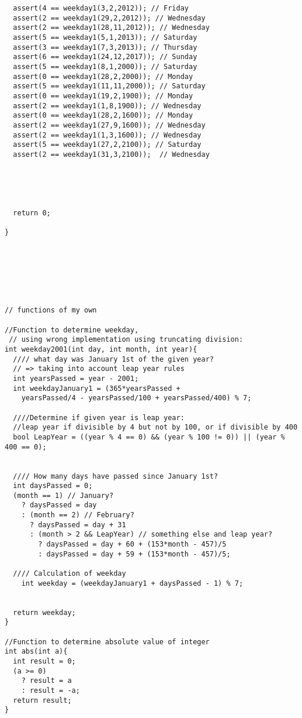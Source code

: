 \begin{lstlisting}
  assert(4 == weekday1(3,2,2012)); // Friday
  assert(2 == weekday1(29,2,2012)); // Wednesday
  assert(2 == weekday1(28,11,2012)); // Wednesday
  assert(5 == weekday1(5,1,2013)); // Saturday
  assert(3 == weekday1(7,3,2013)); // Thursday
  assert(6 == weekday1(24,12,2017)); // Sunday
  assert(5 == weekday1(8,1,2000)); // Saturday
  assert(0 == weekday1(28,2,2000)); // Monday  
  assert(5 == weekday1(11,11,2000)); // Saturday
  assert(0 == weekday1(19,2,1900)); // Monday
  assert(2 == weekday1(1,8,1900)); // Wednesday
  assert(0 == weekday1(28,2,1600)); // Monday
  assert(2 == weekday1(27,9,1600)); // Wednesday
  assert(2 == weekday1(1,3,1600)); // Wednesday
  assert(5 == weekday1(27,2,2100)); // Saturday
  assert(2 == weekday1(31,3,2100));  // Wednesday





  return 0;

}







// functions of my own

//Function to determine weekday,
 // using wrong implementation using truncating division:
int weekday2001(int day, int month, int year){
  //// what day was January 1st of the given year?
  // => taking into account leap year rules
  int yearsPassed = year - 2001;
  int weekdayJanuary1 = (365*yearsPassed + 
    yearsPassed/4 - yearsPassed/100 + yearsPassed/400) % 7;

  ////Determine if given year is leap year:
  //leap year if divisible by 4 but not by 100, or if divisible by 400
  bool LeapYear = ((year % 4 == 0) && (year % 100 != 0)) || (year % 400 == 0);
  

  //// How many days have passed since January 1st?
  int daysPassed = 0;
  (month == 1) // January?
    ? daysPassed = day
    : (month == 2) // February?
      ? daysPassed = day + 31
      : (month > 2 && LeapYear) // something else and leap year?
        ? daysPassed = day + 60 + (153*month - 457)/5
        : daysPassed = day + 59 + (153*month - 457)/5;

  //// Calculation of weekday
    int weekday = (weekdayJanuary1 + daysPassed - 1) % 7;


  return weekday;
}

//Function to determine absolute value of integer
int abs(int a){
  int result = 0;
  (a >= 0)
    ? result = a
    : result = -a;
  return result;
}


\end{lstlisting}
